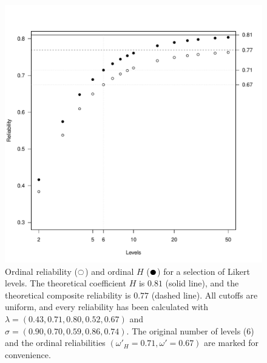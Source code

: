 \documentclass[twoside]{article}
\begin{document}
\begin{figure}
\noindent \begin{centering}
\includegraphics[scale=0.5]{chunks/ordinals}
\par\end{centering}
\caption{\label{fig:Ordinal reliability}Ordinal reliability ($\fullmoon$)
and ordinal $H$ ($\newmoon$) for a selection of Likert levels. The
theoretical coefficient $H$ is $0.81$ (solid line), and the theoretical
composite reliability is $0.77$ (dashed line). All cutoffs are uniform,
and every reliability has been calculated with $\lambda=(0.43,0.71,0.80,0.52,0.67)$
and $\sigma=(0.90,0.70,0.59,0.86,0.74)$. The original number of levels
($6$) and the ordinal reliabilities $(\omega'_{H}=0.71,\omega'=0.67)$
are marked for convenience.}
\end{figure}



\end{document}
